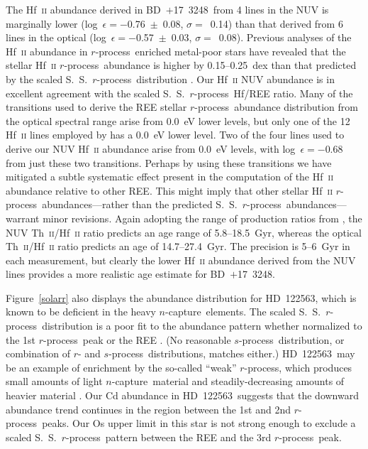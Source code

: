 \documentclass{emulateapj}
\def\bd{\mbox{BD~$+$17~3248}}
\def\hd{\mbox{HD~122563}}
\def\rpro{\mbox{$r$-process}}
\def\spro{\mbox{$s$-process}}
\def\ncap{\mbox{$n$-capture}}
\begin{document}
The Hf~\textsc{ii} abundance derived in \bd\ from 4 lines in the 
NUV is marginally lower 
(log~$\epsilon = -$0.76~$\pm$~0.08, $\sigma =$~0.14)
than that derived from 6 lines in the optical
(log~$\epsilon = -$0.57~$\pm$~0.03, $\sigma =$~0.08).
Previous analyses of the Hf~\textsc{ii} abundance in 
\rpro\ enriched metal-poor stars have revealed that the 
stellar Hf~\textsc{ii} \rpro\ abundance is higher
by 0.15--0.25~dex
than that predicted by the scaled S.~S.\ \rpro\ distribution
\citep{lawler07,roederer09,sneden09}.
Our Hf~\textsc{ii} NUV abundance is in excellent agreement with
the scaled S.~S.\ \rpro\ Hf/REE ratio.
Many of the transitions used to derive the REE stellar \rpro\ 
abundance distribution from the optical spectral range 
arise from 0.0~eV lower levels, but only one of the 12 Hf~\textsc{ii}
lines employed by \citet{lawler07} has a 0.0~eV lower level.
Two of the four lines used to derive our 
NUV Hf~\textsc{ii} abundance arise from 0.0~eV levels,
with log~$\epsilon = -$0.68 
from just these two transitions.
Perhaps by using these transitions we have 
mitigated a subtle systematic effect present in the computation 
of the Hf~\textsc{ii} abundance relative to other REE.
This might imply that other stellar Hf~\textsc{ii} \rpro\ 
abundances---rather than the predicted S.~S.\ \rpro\
abundances---warrant minor revisions.
Again adopting the range of production ratios from \citet{kratz07},
the NUV Th~\textsc{ii}/Hf~\textsc{ii} ratio predicts an age range of 
5.8--18.5~Gyr, whereas the optical 
Th~\textsc{ii}/Hf~\textsc{ii} ratio predicts an age of 
14.7--27.4~Gyr.
The precision is 5--6~Gyr in each measurement, but clearly
the lower Hf~\textsc{ii} abundance derived from the NUV 
lines provides a more realistic age estimate for \bd.

Figure~\ref{solarr} also displays the abundance distribution
for \hd, which is known to be deficient in the heavy \ncap\ elements.
The scaled S.~S.\ \rpro\
distribution is a poor fit to the abundance pattern
whether normalized to the 1st \rpro\ peak or the REE
\citep{honda06}.
(No reasonable \spro\ distribution, or combination of $r$- and
\spro\ distributions, matches either.)
\hd\ may be an example of
enrichment by the so-called ``weak'' \rpro, which produces small amounts
of light \ncap\ material and steadily-decreasing amounts of heavier material
\citep{honda06,wanajo06}.
Our Cd abundance in \hd\ suggests that the downward abundance trend 
continues in the region between the 1st and 2nd \rpro\ peaks.
Our Os upper limit in this star is not strong enough
to exclude a scaled S.~S.\ \rpro\ pattern between the REE
and the 3rd \rpro\ peak. 
\end{document}
